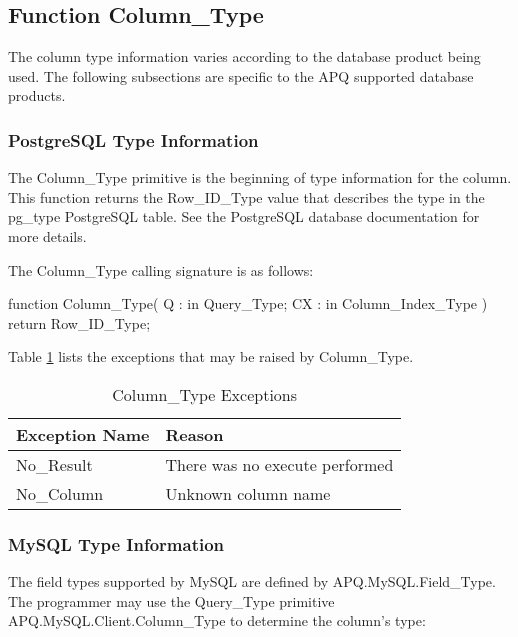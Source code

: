 \documentclass[english,letterpaper]{book}
\begin{document}
\subsection{Function Column\_Type}

The column type information varies according to the database product
being used. The following subsections are specific to the APQ supported
database products.

\subsubsection{PostgreSQL Type Information}

The Column\_Type primitive is the beginning of type information for
the column. This function returns the Row\_ID\_Type
value that describes the type in the pg\_type PostgreSQL table. See
the PostgreSQL database documentation for more details.

The Column\_Type calling signature is as follows:

\begin{Code}
function Column_Type(
   Q :  in Query_Type;
   CX : in Column_Index_Type
) return Row_ID_Type;
\end{Code}

Table \ref{t:ctypx} lists the exceptions that
may be raised by Column\_Type.

\begin{table}
   \begin{center}
      \begin{tabular}{ll}
         Exception Name    &  Reason\\
         \hline 
         No\_Result        &  There was no execute performed\\
         No\_Column        &  Unknown column name\\
      \end{tabular}
   \end{center}
   \caption{Column\_Type Exceptions}\label{t:ctypx}
\end{table}

\subsubsection{MySQL Type Information}

The field types supported by MySQL are defined by APQ\-.MySQL\-.Field\_Type.
The programmer may use the Query\_Type primitive APQ\-.MySQL\-.Client\-.Column\_Type
to determine the column's type:
\end{document}
